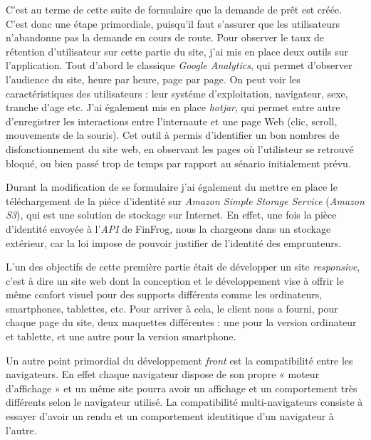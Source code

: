 \documentclass[12pt,a4paper]{article}
\begin{document}
  \bigskip

  C'est au terme de cette suite de formulaire que la demande de prêt est
  créée. C'est donc une étape primordiale, puisqu'il faut s'assurer que
  les utilisateurs n'abandonne pas la demande en cours de route. Pour
  observer le taux de rétention d'utilisateur sur cette partie du site,
  j'ai mis en place deux outils sur l'application. Tout d'abord le
  classique \emph{Google Analytics}, qui permet d'observer l'audience du
  site, heure par heure, page par page. On peut voir les caractéristiques
  des utilisateurs : leur systéme d'exploitation, navigateur, sexe,
  tranche d'age etc. J'ai également mis en place \emph{hotjar}, qui permet
  entre autre d'enregistrer les interactions entre l'internaute et une
  page Web (clic, scroll, mouvements de la souris). Cet outil à permis
  d'identifier un bon nombres de disfonctionnement du site web, en
  observant les pages où l'utilisteur se retrouvé bloqué, ou bien passé
  trop de temps par rapport au sénario initialement prévu.

  \bigskip

  Durant la modification de se formulaire j'ai également du mettre en
  place le téléchargement de la piéce d'identité sur \emph{Amazon Simple
  Storage Service} (\emph{Amazon S3}), qui est une solution de stockage
  sur Internet. En effet, une fois la pièce d'identité envoyée à
  l'\emph{API} de FinFrog, nous la chargeons dans un stockage extérieur,
  car la loi impose de pouvoir justifier de l'identité des emprunteurs.

  \bigskip

  L'un des objectifs de cette première partie était de développer un site
  \emph{responsive}, c'est à dire un site web dont la conception et le
  développement vise à offrir le même confort visuel pour des supports
  différents comme les ordinateurs, smartphones, tablettes, etc. Pour
  arriver à cela, le client nous a fourni, pour chaque page du site, deux
  maquettes différentes : une pour la version ordinateur et tablette, et
  une autre pour la version smartphone.

  \bigskip

  Un autre point primordial du développement \emph{front} est la
  compatibilité entre les navigateurs. En effet chaque navigateur dispose
  de son propre « moteur d'affichage » et un même site pourra avoir un
  affichage et un comportement très différents selon le navigateur
  utilisé. La compatibilité multi-navigateurs consiste à essayer d'avoir
  un rendu et un comportement identitique d'un navigateur à l'autre.
\end{document}
